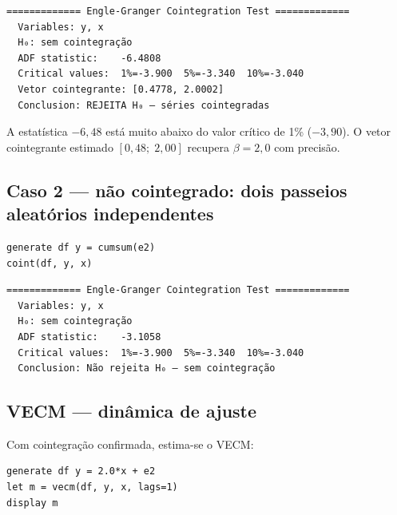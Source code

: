 \begin{lstlisting}[language={}, basicstyle=\ttfamily\small,
  frame=none, numbers=none, backgroundcolor=\color{codbg},
  xleftmargin=0pt, xrightmargin=0pt, breaklines=false]
============= Engle-Granger Cointegration Test =============
  Variables: y, x
  H₀: sem cointegração
  ADF statistic:    -6.4808
  Critical values:  1%=-3.900  5%=-3.340  10%=-3.040
  Vetor cointegrante: [0.4778, 2.0002]
  Conclusion: REJEITA H₀ — séries cointegradas
\end{lstlisting}

A estatística $-6{,}48$ está muito abaixo do valor crítico de 1\%
($-3{,}90$). O vetor cointegrante estimado $[0{,}48;\; 2{,}00]$ recupera
$\beta = 2{,}0$ com precisão.

\subsection*{Caso 2 — não cointegrado: dois passeios aleatórios independentes}

\begin{lstlisting}[caption={Dois random walks — sem cointegração}]
generate df y = cumsum(e2)
coint(df, y, x)
\end{lstlisting}

\begin{lstlisting}[language={}, basicstyle=\ttfamily\small,
  frame=none, numbers=none, backgroundcolor=\color{codbg},
  xleftmargin=0pt, xrightmargin=0pt, breaklines=false]
============= Engle-Granger Cointegration Test =============
  Variables: y, x
  H₀: sem cointegração
  ADF statistic:    -3.1058
  Critical values:  1%=-3.900  5%=-3.340  10%=-3.040
  Conclusion: Não rejeita H₀ — sem cointegração
\end{lstlisting}

\subsection*{VECM — dinâmica de ajuste}

Com cointegração confirmada, estima-se o VECM:

\begin{lstlisting}[caption={VECM com rank 1}]
generate df y = 2.0*x + e2
let m = vecm(df, y, x, lags=1)
display m
\end{lstlisting}

